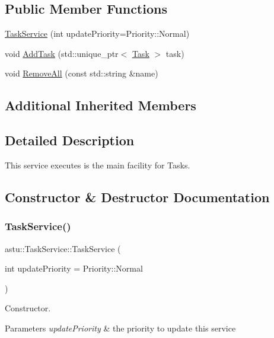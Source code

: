 \subsection*{Public Member Functions}
\begin{DoxyCompactItemize}
\item 
\hyperlink{classastu_1_1TaskService_a5c0c76497313bcaf6d54042efa834ad6}{Task\+Service} (int update\+Priority=Priority\+::\+Normal)
\item 
void \hyperlink{classastu_1_1TaskService_ac2458d90fef0ce197459247a6b720850}{Add\+Task} (std\+::unique\+\_\+ptr$<$ \hyperlink{classastu_1_1Task}{Task} $>$ task)
\item 
void \hyperlink{classastu_1_1TaskService_af86998c6284f9c682d0bbc1681b7592a}{Remove\+All} (const std\+::string \&name)
\end{DoxyCompactItemize}
\subsection*{Additional Inherited Members}


\subsection{Detailed Description}
This service executes is the main facility for Tasks. 

\subsection{Constructor \& Destructor Documentation}
\mbox{\label{classastu_1_1TaskService_a5c0c76497313bcaf6d54042efa834ad6}} 
\subsubsection{\texorpdfstring{Task\+Service()}{TaskService()}}
{\footnotesize\ttfamily astu\+::\+Task\+Service\+::\+Task\+Service (\begin{DoxyParamCaption}\item[{int}]{update\+Priority = {\ttfamily Priority\+:\+:Normal} }\end{DoxyParamCaption})}

Constructor.


\begin{DoxyParams}{Parameters}
{\em update\+Priority} & the priority to update this service \\
\hline
\end{DoxyParams}


